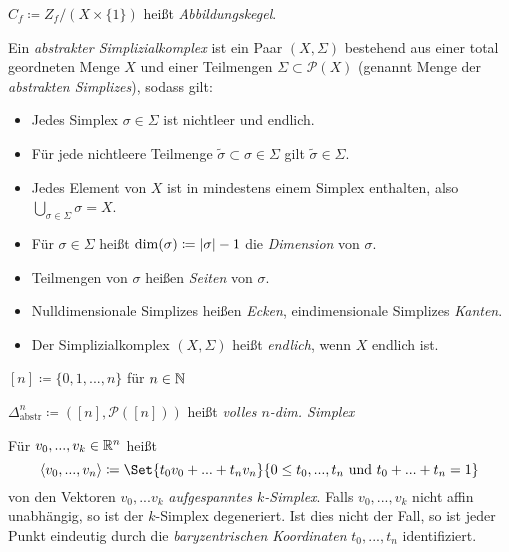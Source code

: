 \documentclass{cheat-sheet}
\begin{document}
\begin{defn}
  $C_f \coloneqq Z_f / (X \times \{ 1 \})$ heißt \emph{Abbildungskegel}.
\end{defn}

\begin{defn}
  Ein \emph{abstrakter Simplizialkomplex} ist ein Paar $(X, \Sigma)$ bestehend aus einer total geordneten Menge $X$ und einer Teilmengen $\Sigma \subset \mathcal{P}(X)$ (genannt Menge der \emph{abstrakten Simplizes}), sodass gilt:
  \begin{itemize}
    \item Jedes Simplex $\sigma \in \Sigma$ ist nichtleer und endlich.
    \item Für jede nichtleere Teilmenge $\tilde{\sigma} \subset \sigma \in \Sigma$ gilt $\tilde{\sigma} \in \Sigma$.
    \item Jedes Element von $X$ ist in mindestens einem Simplex enthalten, also $\bigcup_{\sigma \in \Sigma} \sigma = X$.
  \end{itemize}
\end{defn}

\begin{defn}
  \begin{itemize}
    \item Für $\sigma \in \Sigma$ heißt $\dim(\sigma) \coloneqq \lvert\sigma\rvert - 1$ die \emph{Dimension} von $\sigma$.
    \item Teilmengen von $\sigma$ heißen \emph{Seiten} von $\sigma$.
    \item Nulldimensionale Simplizes heißen \emph{Ecken}, eindimensionale Simplizes \emph{Kanten}.
    \item Der Simplizialkomplex $(X, \Sigma)$ heißt \emph{endlich}, wenn $X$ endlich ist.
  \end{itemize}
\end{defn}

\begin{nota}
  $[n] \coloneqq \{ 0, 1, ..., n \}$ für $n \in \mathbb{N}$
\end{nota}

\begin{defn}
  $\Delta^n_{\text{abstr}} \coloneqq ([n], \mathcal{P}([n]))$ heißt \emph{volles $n$-dim. Simplex}
\end{defn}

\begin{defn}
  Für $v_0, ..., v_k \in \mathbb{R}^n$ heißt
  \[ \langle v_0, ..., v_n \rangle \coloneqq \Set{ t_0 v_0 + ... + t_n v_n }{ 0 \leq t_0, ..., t_n \text{ und } t_0 + ... + t_n = 1 } \]
  von den Vektoren $v_0, ... v_k$ \emph{aufgespanntes $k$-Simplex}. Falls $v_0, ..., v_k$ nicht affin unabhängig, so ist der $k$-Simplex degeneriert. Ist dies nicht der Fall, so ist jeder Punkt eindeutig durch die \emph{baryzentrischen Koordinaten} $t_0, ..., t_n$ identifiziert.
\end{defn}
\end{document}

